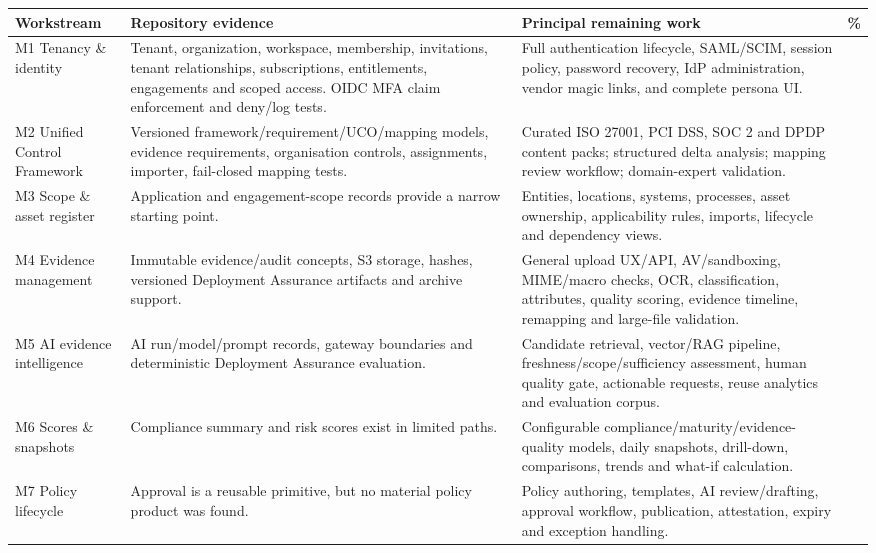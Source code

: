 \documentclass[11pt,a4paper]{article}
\begin{document}
\small
\begin{longtable}{@{}>{\raggedright\arraybackslash}p{} >{\raggedright\arraybackslash}p{} >{\raggedright\arraybackslash}p{} >{\raggedleft\arraybackslash}p{}@{}}
\toprule
Workstream & Repository evidence & Principal remaining work & \% \\
\midrule
\endhead
M1 Tenancy \& identity & Tenant, organization, workspace, membership, invitations, tenant relationships, subscriptions, entitlements, engagements and scoped access. OIDC MFA claim enforcement and deny/log tests. & Full authentication lifecycle, SAML/SCIM, session policy, password recovery, IdP administration, vendor magic links, and complete persona UI. & 55 \\
M2 Unified Control Framework & Versioned framework/requirement/UCO/mapping models, evidence requirements, organisation controls, assignments, importer, fail-closed mapping tests. & Curated ISO 27001, PCI DSS, SOC 2 and DPDP content packs; structured delta analysis; mapping review workflow; domain-expert validation. & 45 \\
M3 Scope \& asset register & Application and engagement-scope records provide a narrow starting point. & Entities, locations, systems, processes, asset ownership, applicability rules, imports, lifecycle and dependency views. & 25 \\
M4 Evidence management & Immutable evidence/audit concepts, S3 storage, hashes, versioned Deployment Assurance artifacts and archive support. & General upload UX/API, AV/sandboxing, MIME/macro checks, OCR, classification, attributes, quality scoring, evidence timeline, remapping and large-file validation. & 30 \\
M5 AI evidence intelligence & AI run/model/prompt records, gateway boundaries and deterministic Deployment Assurance evaluation. & Candidate retrieval, vector/RAG pipeline, freshness/scope/sufficiency assessment, human quality gate, actionable requests, reuse analytics and evaluation corpus. & 25 \\
M6 Scores \& snapshots & Compliance summary and risk scores exist in limited paths. & Configurable compliance/maturity/evidence-quality models, daily snapshots, drill-down, comparisons, trends and what-if calculation. & 20 \\
M7 Policy lifecycle & Approval is a reusable primitive, but no material policy product was found. & Policy authoring, templates, AI review/drafting, approval workflow, publication, attestation, expiry and exception handling. & 5 \\

\end{longtable}
\end{document}
